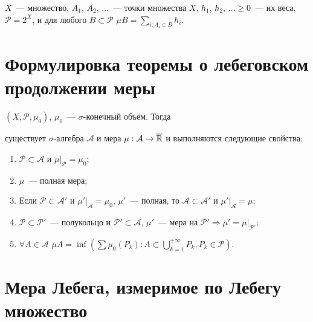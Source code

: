 \documentclass{article}
\begin{document}
        $X$~--- множество, $A_1$, $A_2$, $\ldots$~--- точки множества $X$, $h_1$, $h_2$, $\ldots \geqslant 0$~--- их веса, $\mathcal{P} = 2^X$, и для любого $B \subset \mathcal{P}$ $\mu B = \sum\limits_{i : A_i \in B} h_i$.
        
    \newpage
    
    \section{Формулировка теоремы о лебеговском продолжении меры}
    
        $(X, \mathcal{P}, \mu_0)$, $\mu_0$~--- $\sigma$-конечный объём. Тогда
        
        существует $\sigma$-алгебра $\mathcal{A}$ и мера $\mu : \mathcal{A} \rightarrow \overline{\mathbb{R}}$ и выполняются следующие свойства:
        
        \begin{enumerate}
        
            \item $\mathcal{P} \subset \mathcal{A}$ и $\mu \big|_{\mathcal{P}} = \mu_0$;
            
            \item $\mu$~--- полная мера;
            
            \item Если $\mathcal{P} \subset \mathcal{A}'$ и $\mu' \big|_{\mathcal{A}} = \mu_0$, $\mu'$~--- полная, то $\mathcal{A} \subset \mathcal{A}'$ и $\mu' \big|_{\mathcal{A}} = \mu$;
            
            \item $\mathcal{P} \subset \mathcal{P}'$~--- полукольцо и $\mathcal{P}' \subset \mathcal{A}$, $\mu'$~--- мера на $\mathcal{P}' \Rightarrow \mu' = \mu \big|_{\mathcal{P}'}$;
            
            \item $\forall A \in \mathcal{A}$ $\mu A = \inf \left( \sum \mu_0 \left( P_k \right) : A \subset \bigcup\limits^{+\infty}_{k = 1} P_k, P_k \in \mathcal{P} \right)$.
            
        \end{enumerate}
        
    \newpage
    
    \section{Мера Лебега, измеримое по Лебегу множество}
    
\end{document}
